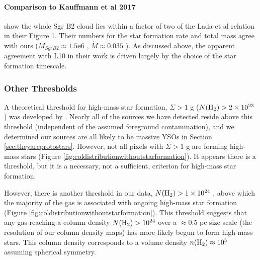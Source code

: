 \documentclass[twocolumn]{aastex61}
\begin{document}


\paragraph{Comparison to Kauffmann et al 2017}
\label{sec:kauffcompare}
\citet{Kauffmann2017c} show the whole Sgr B2 cloud lies within a factor of two
of the Lada et al relation in their Figure 1.  Their numbers for the star
formation rate and total mass agree with ours ($M_{Sgr B2}\approx1.5\ee{6}$
\msun, $\dot{M}\approx 0.035$ \msun \peryr).  As discussed above, the apparent
agreement with L10 in their work is driven largely by the choice of the star
formation timescale.  


\subsubsection{Other Thresholds}
\label{sec:otherthresholds}

A theoretical threshold for high-mass star formation, $\Sigma > 1$ g \persc
($N(\textrm{H}_{2}) > 2\times10^{23}$ \persc) was developed by \citet{Krumholz2008a}.   Nearly
all of the sources we have detected reside above this threshold (independent of
the assumed foreground contamination), and we determined our sources are all
likely to be massive YSOs in Section \ref{sec:theyareprotostars}.
However, not all pixels with $\Sigma > 1$ g \persc are forming high-mass stars
(Figure \ref{fig:coldistributionwithoutstarformation}).  It appears
there is a threshold, but it is a necessary, not a sufficient, criterion
for high-mass star formation.

However, there is another threshold in our data, $N(\textrm{H}_{2})>1\times10^{24}$ \persc,
above which the majority of the gas is associated with ongoing high-mass star
formation (Figure \ref{fig:coldistributionwithoutstarformation}).  This
threshold suggests that any gas reaching a column density $N(\textrm{H}_{2})>10^{24}$
\persc over a $\approx0.5$ pc size scale (the resolution of our column density
maps) has more likely begun to form high-mass stars.  This column
density corresponds to a volume density $n(\textrm{H}_{2})\approx10^5$ \percc assuming
spherical symmetry.
\end{document}
